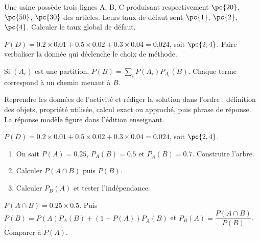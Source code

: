    \begin{activity}
    Une usine possède trois lignes A, B, C produisant respectivement $\pc{20}$, $\pc{50}$, $\pc{30}$ des articles. Leurs taux de défaut sont $\pc{1}$, $\pc{2}$, $\pc{4}$. Calculer le taux global de défaut.
    \begin{center}\end{center}
    \end{activity}
    \begin{solution}$P(D)=\num{0,2}\times\num{0,01}+\num{0,5}\times\num{0,02}+\num{0,3}\times\num{0,04}=\num{0,024}$, soit $\pc{2,4}$. Faire verbaliser la donnée qui déclenche le choix de méthode.\end{solution}

    \begin{summary}Si $(A_i)$ est une partition, $P(B)=\sum_i P(A_i)P_{A_i}(B)$. Chaque terme correspond à un chemin menant à $B$.\end{summary}

    \begin{example}
    Reprendre les données de l'activité et rédiger la solution dans l'ordre : définition des objets, propriété utilisée, calcul exact ou approché, puis phrase de réponse. La réponse modèle figure dans l'édition enseignant.
    \end{example}
    \begin{solution}$P(D)=\num{0,2}\times\num{0,01}+\num{0,5}\times\num{0,02}+\num{0,3}\times\num{0,04}=\num{0,024}$, soit $\pc{2,4}$.\end{solution}

    \begin{exercise}[essentiel]
    \begin{enumerate}\item On sait $P(A)=\num{0,25}$, $P_A(B)=\num{0,5}$ et $P_{\overline A}(B)=\num{0,7}$. Construire l'arbre.\item Calculer $P(A\cap B)$ puis $P(B)$.\item Calculer $P_B(A)$ et tester l'indépendance.\end{enumerate}
    \end{exercise}
    \begin{solution}$P(A\cap B)=\num{0,25}\times\num{0,5}$. Puis $P(B)=P(A)P_A(B)+(1-P(A))P_{\overline A}(B)$ et $P_B(A)=\dfrac{P(A\cap B)}{P(B)}$. Comparer à $P(A)$.\end{solution}

